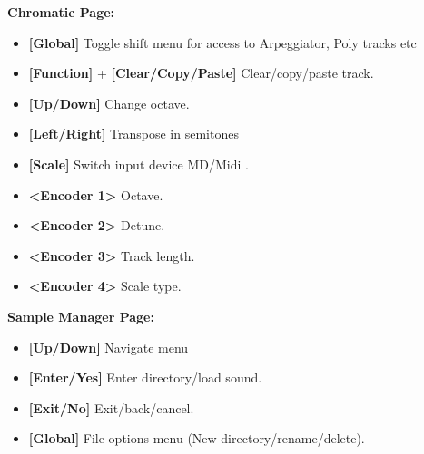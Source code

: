 \textbf{Chromatic Page:}
      \begin{itemize}
      \item \textbf{[Global] }Toggle shift menu for access to Arpeggiator, Poly tracks etc
      \item \textbf{[Function]} + \textbf{[Clear/Copy/Paste]} Clear/copy/paste track.
      \item \textbf{[Up/Down]} Change octave.
      \item \textbf{[Left/Right]} Transpose in semitones
      \item \textbf{[Scale]} Switch input device MD/Midi .
      \item \textbf{<Encoder 1>} Octave.
      \item \textbf{<Encoder 2>} Detune.
      \item \textbf{<Encoder 3>} Track length.
      \item \textbf{<Encoder 4>} Scale type.
      \end{itemize}
\newpage
\textbf{Sample Manager Page:} 
\begin{itemize}

     \item \textbf{[Up/Down] }Navigate menu
     \item \textbf{[Enter/Yes]} Enter directory/load sound.
     \item \textbf{[Exit/No]} Exit/back/cancel.
     \item \textbf{[Global] }File options menu (New directory/rename/delete).
     \end{itemize}

